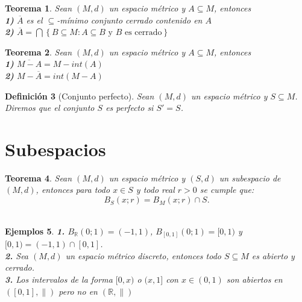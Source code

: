 \documentclass[oneside]{book} %
\theoremstyle{Teorema}
\newtheorem{Definicion}{Definición}[chapter]
\newtheorem{Teorema}[Definicion]{Teorema}
\theoremstyle{Ejemplos}
\newtheorem{Ejemplos}[Definicion]{Ejemplos}
\theoremstyle{[Obs]}
\newcommand{\normSymbol}{\lVert} %
\renewcommand{\{}{\left\lbrace} %
\renewcommand{\}}{\right\rbrace} %
\newcommand{\n}{\cap} %
\newcommand{\N}{\bigcap} %
\renewcommand{\sc}{\subseteq} %
\newcommand{\R}{\mathbb{R}} %
\begin{document}
			\begin{Teorema}
				
				Sean $(M, d)$ un espacio métrico y $A \sc M$, entonces \\

				\textbf{1)} $\overline{A}$ es el $\sc$-mínimo conjunto cerrado contenido en $A$ \\

				\textbf{2)} $\overline{A} = \N\{ B \sc M : A \sc B \text{ y } B \text{ es cerrado} \}$ \\

			\end{Teorema}

			\begin{Teorema}
				
				Sean $(M, d)$ un espacio métrico y $A \sc M$, entonces \\

				\textbf{1)} $\overline{M - A} = M - int(A)$ \\

				\textbf{2)} $M - \overline{A} = int(M - A)$ \\

			\end{Teorema}

			\begin{Definicion}[Conjunto perfecto]
				
				Sean $(M, d)$ un espacio métrico y $S \sc M$. Diremos que el conjunto $S$ es perfecto si $S' = S$. \\

			\end{Definicion}

		\section{Subespacios}

			\begin{Teorema}
				
				Sean $(M, d)$ un espacio métrico y $(S, d)$ un subespacio de $(M, d)$, entonces para todo $x \in S$ y todo real $r > 0$ se cumple que: \\

				\[ B_S(x;r) = B_M(x;r) \n S. \] \\

			\end{Teorema}

			\begin{Ejemplos}
				
				\textbf{1.} $B_{\R}(0;1) = (-1, 1)$, $B_{[0, 1]}(0;1) = [0, 1)$ y $[0, 1) = (-1, 1) \n [0, 1]$. \\

				\textbf{2.} Sea $(M, d)$ un espacio métrico discreto, entonces todo $S \sc M$ es abierto y cerrado. \\

				\textbf{3.} Los intervalos de la forma $[0, x)$ o $(x, 1]$ con $x \in (0, 1)$ son abiertos en $([0, 1], \normSymbol)$ pero no en $(\R, \normSymbol)$ \\

			\end{Ejemplos}
\end{document}
